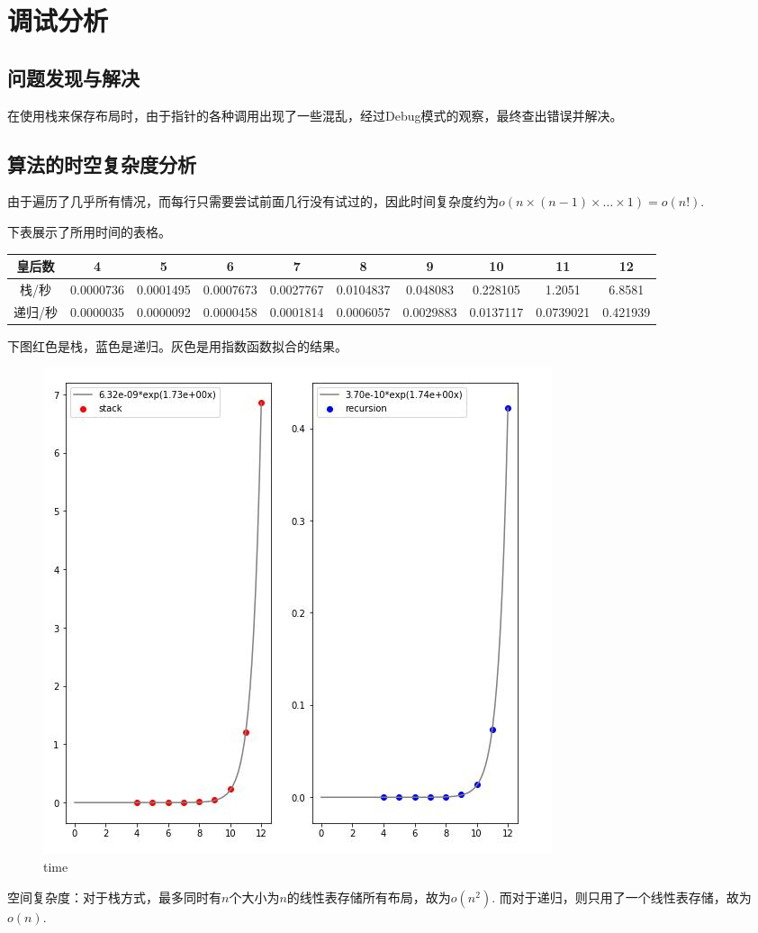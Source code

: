 \documentclass[UTF8]{article}
\begin{document}
	
	\section{调试分析}
	\subsection{问题发现与解决}
	在使用栈来保存布局时，由于指针的各种调用出现了一些混乱，经过Debug模式的观察，最终查出错误并解决。
	
	\subsection{算法的时空复杂度分析}
	由于遍历了几乎所有情况，而每行只需要尝试前面几行没有试过的，因此时间复杂度约为$o(n\times (n-1)\times \dots \times 1)=o(n!)$.\par
	下表展示了所用时间的表格。\\
	\begin{table}[H]
		\footnotesize
		\begin{tabular}{|c|c|c|c|c|c|c|c|c|c|}
			\hline 
			皇后数 & 4 & 5 & 6 & 7 & 8 & 9 & 10 & 11 & 12 \\ 
			\hline 
			栈/秒 & 0.0000736 & 0.0001495 & 0.0007673 & 0.0027767 & 0.0104837 & 0.048083 & 0.228105 & 1.2051 & 6.8581 \\ 
			\hline 
			递归/秒 & 0.0000035 & 0.0000092 & 0.0000458 & 0.0001814 & 0.0006057 & 0.0029883 & 0.0137117 & 0.0739021 & 0.421939 \\ 
			\hline 
		\end{tabular} 
	\end{table}
	下图红色是栈，蓝色是递归。灰色是用指数函数拟合的结果。\par
	\begin{figure}[H]
		\centering
		\includegraphics[scale=1]{time.jpg}
		\caption{time}
		\label{time}
	\end{figure}\par
	空间复杂度：对于栈方式，最多同时有$n$个大小为$n$的线性表存储所有布局，故为$o(n^{2})$.
	而对于递归，则只用了一个线性表存储，故为$o(n)$.\par
	
\end{document}
